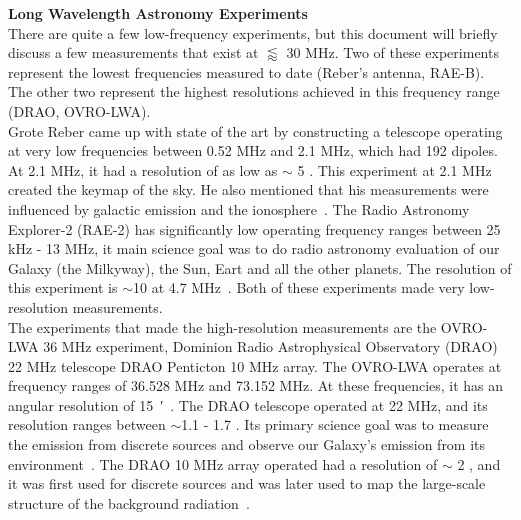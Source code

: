 	    {\bf{Long Wavelength Astronomy Experiments}}\\
	    
	    There are quite a few low-frequency experiments, but this document will briefly discuss a few measurements that exist at $\lessapprox$ 30 MHz. Two of these experiments represent the lowest frequencies measured to date (Reber's antenna, RAE-B). The other two represent the highest resolutions achieved in this frequency range (DRAO, OVRO-LWA).\\
	    
	    Grote Reber came up with state of the art by constructing a telescope operating at very low frequencies between 0.52 MHz and 2.1 MHz, which had 192 dipoles. At 2.1 MHz, it had a resolution of as low as $\sim$ 5 \degree. This experiment at 2.1 MHz created the keymap of the sky. He also mentioned that his measurements were influenced by galactic emission and the ionosphere~\citep{article, 1988A&A...195..372W}. The Radio Astronomy Explorer-2 (RAE-2) has significantly low operating frequency ranges between 25 kHz - 13 MHz, it main science goal was to do radio astronomy evaluation of our Galaxy (the Milkyway), the Sun, Eart and all the other planets. The resolution of this experiment is $\sim$10 \degree at 4.7 MHz~\citep{1975A&A....40..365A}. Both of these experiments made very low-resolution measurements.\\
	    
	    The experiments that made the high-resolution measurements are the OVRO-LWA 36 MHz experiment, Dominion Radio Astrophysical Observatory (DRAO) 22 MHz telescope DRAO Penticton 10 MHz array. The OVRO-LWA operates at frequency ranges of 36.528 MHz and 73.152 MHz. At these frequencies, it has an angular resolution of \SI{15}{\arcminute}~\citep{2018AJ....156...32E}. The DRAO telescope operated at 22 MHz, and its resolution ranges between $\sim$1.1 \degree - 1.7 \degree. Its primary science goal was to measure the emission from discrete sources and observe our Galaxy's emission from its environment~\citep{1999A&AS..137....7R}. The DRAO 10 MHz array operated had a resolution of $\sim$ 2  \degree, and it was first used for discrete sources and was later used to map the large-scale structure of the background radiation~\citep{1976MNRAS.177..601C}.
	    
